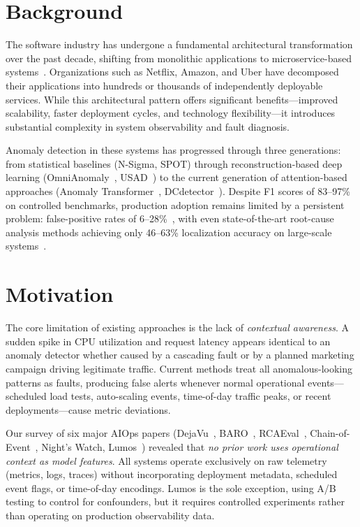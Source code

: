 \documentclass[12pt,a4paper]{report}
\begin{document}
\section{Background}

The software industry has undergone a fundamental architectural transformation over the past decade, shifting from monolithic applications to microservice-based systems~\cite{soldani2022survey}. Organizations such as Netflix, Amazon, and Uber have decomposed their applications into hundreds or thousands of independently deployable services. While this architectural pattern offers significant benefits---improved scalability, faster deployment cycles, and technology flexibility---it introduces substantial complexity in system observability and fault diagnosis.

Anomaly detection in these systems has progressed through three generations: from statistical baselines (N-Sigma, SPOT) through reconstruction-based deep learning (OmniAnomaly~\cite{su2019omnianomaly}, USAD~\cite{audibert2020usad}) to the current generation of attention-based approaches (Anomaly Transformer~\cite{xu2022anomalytransformer}, DCdetector~\cite{yang2023dcdetector}). Despite F1 scores of 83--97\% on controlled benchmarks, production adoption remains limited by a persistent problem: false-positive rates of 6--28\%~\cite{soldani2022survey}, with even state-of-the-art root-cause analysis methods achieving only 46--63\% localization accuracy on large-scale systems~\cite{pham2024rcaeval}.

\section{Motivation}

The core limitation of existing approaches is the lack of \textit{contextual awareness}. A sudden spike in CPU utilization and request latency appears identical to an anomaly detector whether caused by a cascading fault or by a planned marketing campaign driving legitimate traffic. Current methods treat all anomalous-looking patterns as faults, producing false alerts whenever normal operational events---scheduled load tests, auto-scaling events, time-of-day traffic peaks, or recent deployments---cause metric deviations.

Our survey of six major AIOps papers (DejaVu~\cite{li2022dejavu}, BARO~\cite{chen2024baro}, RCAEval~\cite{pham2024rcaeval}, Chain-of-Event~\cite{chainofevent2024}, Night's Watch, Lumos~\cite{lumos2020}) revealed that \textit{no prior work uses operational context as model features}. All systems operate exclusively on raw telemetry (metrics, logs, traces) without incorporating deployment metadata, scheduled event flags, or time-of-day encodings. Lumos is the sole exception, using A/B testing to control for confounders, but it requires controlled experiments rather than operating on production observability data.
\end{document}

